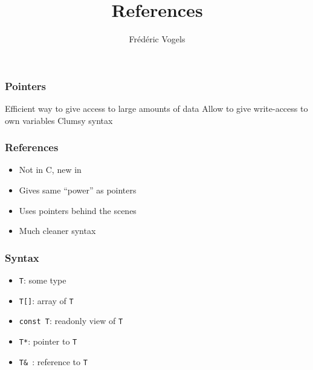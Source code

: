 \usepackage{../pvm}
\usetikzlibrary{shadows,shapes.multipart}

\title{References}
\author{Fr\'ed\'eric Vogels}

\newcommand{\highlightbox}[2][]{
  \draw[opacity=.75,ultra thick,red,#1] ($ (#2.south west) + (-.1,-.1) $) rectangle ($ (#2.north east) + (.1,.1) $)
}




\begin{frame}
  \titlepage
\end{frame}

\begin{frame}
  \frametitle{Pointers}
  \begin{procontralist}
    \pro Efficient way to give access to large amounts of data
    \pro Allow to give write-access to own variables
    \con Clumsy syntax
  \end{procontralist}
  \vskip5mm
\end{frame}

\begin{frame}
  \frametitle{References}
  \begin{itemize}
    \item Not in C, new in \cpp
    \item Gives same ``power'' as pointers
    \item Uses pointers behind the scenes
    \item Much cleaner syntax
  \end{itemize}
\end{frame}

\begin{frame}
  \frametitle{Syntax}
  \begin{itemize}
    \item {\tt T}: some type
    \item {\tt T[]}: array of {\tt T}
    \item {\tt const T}: readonly view of {\tt T}
    \item {\tt T*}: pointer to {\tt T}
    \item<2-> {\tt T\& }: reference to {\tt T}
  \end{itemize}
\end{frame}

